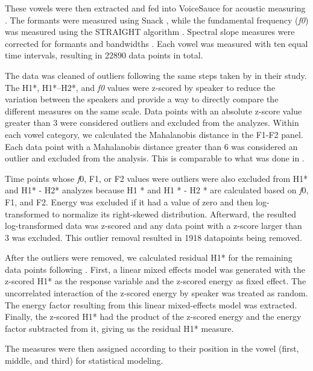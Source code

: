 These vowels were then extracted and fed into VoiceSauce for acoustic measuring \citep{shueVOICESAUCEProgramVoice2009}. The formants were measured using Snack \citep{sjolanderSnackSoundToolkit2004}, while the fundamental frequency (\textit{f0}) was measured using the STRAIGHT algorithm \citep{kawaharaInstantaneousfrequencybasedPitchExtraction1998}. Spectral slope measures were corrected for formants and bandwidths \citep{hansonGlottalCharacteristicsFemale1997,iseliAgeSexVowel2007}. Each vowel was measured with ten equal time intervals, resulting in 22890 data points in total.

The data was cleaned of outliers following the same steps taken by \citet{chaiH1H2Acoustic2022} in their study. The H1*, H1*–H2*, and \textit{f0} values were z-scored by speaker to reduce the variation between the speakers and provide a way to directly compare the different measures on the same scale. Data points with an absolute z-score value greater than 3 were considered outliers and excluded from the analyzes. Within each vowel category, we calculated the Mahalanobis distance in the F1-F2 panel. Each data point with a Mahalanobis distance greater than 6 was considered an outlier and excluded from the analysis. This is comparable to what was done in \citet{garellekPhoneticsWhiteHmong2021,seyfarthPlosiveVoicingAcoustics2018,chaiCheckedSyllablesChecked2022}. 

Time points whose \textit{f}0, F1, or F2 values were outliers were also excluded from H1* and H1* - H2* analyzes because H1 * and H1 * - H2 * are calculated based on \textit{f}0, F1, and F2. Energy was excluded if it had a value of zero and then log-transformed to normalize its right-skewed distribution. Afterward, the resulted log-transformed data was z-scored and any data point with a z-score larger than 3 was excluded. This outlier removal resulted in 1918 datapoints being removed. 

After the outliers were removed, we calculated residual H1* for the remaining data points following \citet{chaiH1H2Acoustic2022}. First, a linear mixed effects model was generated with the z-scored H1* as the response variable and the z-scored energy as fixed effect. The uncorrelated interaction of the z-scored energy by speaker was treated as random. The energy factor resulting from this linear mixed-effects model was extracted. Finally, the z-scored H1* had the product of the z-scored energy and the energy factor subtracted from it, giving us the residual H1* measure.

The measures were then assigned according to their position in the vowel (first, middle, and third) for statistical modeling.  

